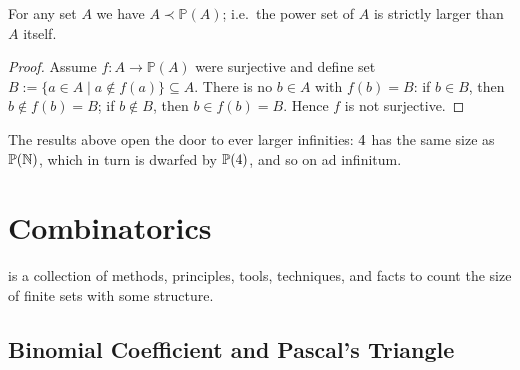 \begin{theorem}[Cantor]\label{thm:cantor}
For any set \(A\) we have \(A\prec\mathbb{P}(A)\); i.e.\ the power set of \(A\) is strictly larger than \(A\) itself.
\end{theorem}

\begin{proof}
Assume \(f\colon A\to\mathbb{P}(A)\) were surjective and define set
\(
B:=\{a\in A\mid a\notin f(a)\} \subseteq A
\).
There is no \(b\in A\) with \(f(b)=B\): if \(b\in B\), then \(b\notin f(b)=B\); if \(b\notin B\), then \(b\in f(b)=B\).  Hence \(f\) is not surjective.
\end{proof}



The results above open the door to ever larger infinities:  
\(4\) has the same size as \(\mathbb{P}(\mathbb{N})\), which in turn is dwarfed by \(\mathbb{P}(4)\), and so on ad infinitum.












\clearpage
\section{Combinatorics}
\label{sec:combinatorics}

is a collection of methods, principles, tools, techniques, and facts to count the size of finite sets with some structure. 

\subsection{Binomial Coefficient and Pascal's Triangle}
\label{subsec:binomial-coefficient}

